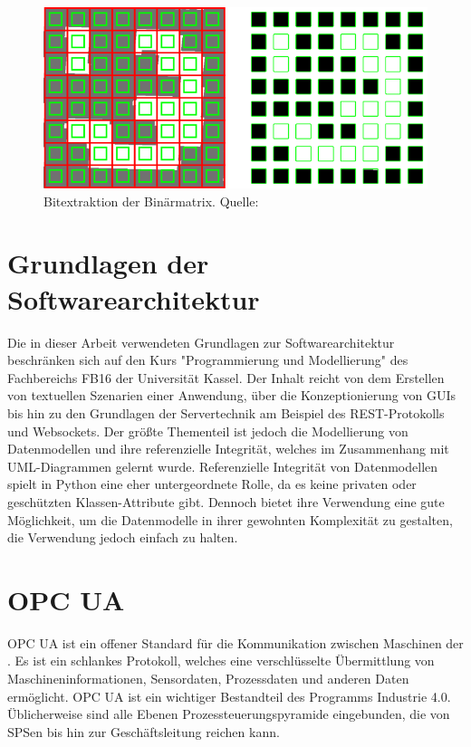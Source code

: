 \begin{figure}
    \caption{Bitextraktion der Binärmatrix. Quelle: \cite[OpenCV]{OpenCVaruco}}\label{fig:aruco6}
    \includegraphics[width = \textwidth]{Bilder/bitsextraction2.png}
    \centering
\end{figure}



\section{Grundlagen der Softwarearchitektur}

Die in dieser Arbeit verwendeten Grundlagen zur Softwarearchitektur beschränken sich auf den Kurs "Programmierung und Modellierung" des Fachbereichs
FB16 der Universität Kassel. Der Inhalt reicht von dem Erstellen von textuellen Szenarien einer Anwendung, über die Konzeptionierung von GUIs bis hin
zu den Grundlagen der Servertechnik am Beispiel des REST-Protokolls und Websockets. 
Der größte Thementeil ist jedoch die Modellierung von Datenmodellen und ihre referenzielle Integrität, welches im Zusammenhang mit UML-Diagrammen gelernt wurde.
Referenzielle Integrität von Datenmodellen spielt in Python eine eher untergeordnete Rolle, da es keine privaten oder geschützten Klassen-Attribute gibt. 
Dennoch bietet ihre Verwendung eine gute Möglichkeit, um die Datenmodelle in ihrer gewohnten Komplexität zu gestalten, die
Verwendung jedoch einfach zu halten.

\section{OPC UA}

OPC UA ist ein offener Standard für die Kommunikation zwischen Maschinen der \cite[OPC Foundation]{OPCFoundation}. Es ist ein schlankes Protokoll, 
welches eine verschlüsselte Übermittlung von Maschineninformationen, Sensordaten, Prozessdaten und anderen Daten ermöglicht.
OPC UA ist ein wichtiger Bestandteil des Programms Industrie 4.0. 
Üblicherweise sind alle Ebenen Prozessteuerungspyramide eingebunden, die von SPSen bis hin zur Geschäftsleitung reichen kann.

